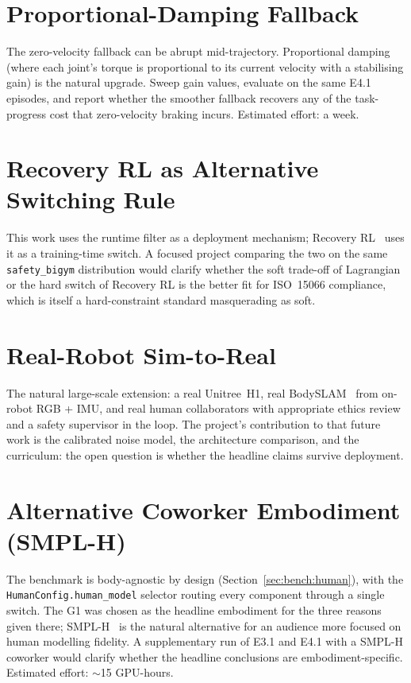 \documentclass[11pt,a4paper]{report}
\newcommand{\iso}{ISO~15066}
\newcommand{\sbigym}{\texttt{safety\_bigym}}
\newcommand{\bodyslampp}{BodySLAM\nolinebreak[4]\hspace{-.05em}\raisebox{.2ex}{\scriptsize ++}}
\begin{document}
\section{Proportional-Damping Fallback}
\label{sec:fw:fallback}

The zero-velocity fallback can be abrupt mid-trajectory. Proportional
damping (where each joint's torque is proportional to its current
velocity with a stabilising gain) is the natural upgrade. Sweep
gain values, evaluate on the same E4.1 episodes, and report whether
the smoother fallback recovers any of the task-progress cost that
zero-velocity braking incurs. Estimated effort: a week.

\section{Recovery RL as Alternative Switching Rule}
\label{sec:fw:recovery}

This work uses the runtime filter as a deployment mechanism;
Recovery RL~\cite{thananjeyan2021recovery} uses it as a
training-time switch. A focused project comparing the two on the
same \sbigym{} distribution would clarify whether the soft trade-off
of Lagrangian or the hard switch of Recovery RL is the better fit
for \iso{} compliance, which is itself a hard-constraint standard
masquerading as soft.

\section{Real-Robot Sim-to-Real}
\label{sec:fw:realbody}

The natural large-scale extension: a real Unitree~H1, real
\bodyslampp{}~\cite{henning2023bodyslampp} from on-robot RGB +
IMU, and real human collaborators with appropriate ethics review
and a safety supervisor in the loop. The project's contribution to
that future work is the calibrated noise model, the architecture
comparison, and the curriculum: the open question is whether the
headline claims survive deployment.

\section{Alternative Coworker Embodiment (SMPL-H)}
\label{sec:fw:embodiment}

The benchmark is body-agnostic by design
(Section~\ref{sec:bench:human}), with the
\texttt{HumanConfig.human\_model} selector routing every component
through a single switch. The G1 was chosen as the headline
embodiment for the three reasons given there; SMPL-H~\cite{romero2017smplh}
is the natural alternative for an audience more focused on human
modelling fidelity. A supplementary run of E3.1 and E4.1 with a
SMPL-H coworker would clarify whether the headline conclusions are
embodiment-specific. Estimated effort: $\sim$15 GPU-hours.
\end{document}
